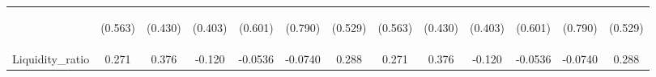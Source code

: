 \documentclass[]{article}
\begin{document}
\begin{center}
\begin{tabular}{lcccccccccccc}
\vspace{4pt} & \begin{footnotesize}(0.563)\end{footnotesize} & \begin{footnotesize}(0.430)\end{footnotesize} & \begin{footnotesize}(0.403)\end{footnotesize} & \begin{footnotesize}(0.601)\end{footnotesize} & \begin{footnotesize}(0.790)\end{footnotesize} & \begin{footnotesize}(0.529)\end{footnotesize} & \begin{footnotesize}(0.563)\end{footnotesize} & \begin{footnotesize}(0.430)\end{footnotesize} & \begin{footnotesize}(0.403)\end{footnotesize} & \begin{footnotesize}(0.601)\end{footnotesize} & \begin{footnotesize}(0.790)\end{footnotesize} & \begin{footnotesize}(0.529)\end{footnotesize} \\
Liquidity\_ratio & 0.271 & 0.376 & -0.120 & -0.0536 & -0.0740 & 0.288 & 0.271 & 0.376 & -0.120 & -0.0536 & -0.0740 & 0.288 \\

\end{tabular}
\end{center}
\end{document}
